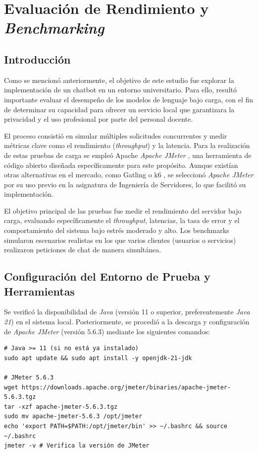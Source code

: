 \chapter{Evaluación de Rendimiento y \textit{Benchmarking}}

\section{Introducción}
Como se mencionó anteriormente, el objetivo de este estudio fue explorar la implementación de un chatbot en un entorno universitario. Para ello, resultó importante evaluar el desempeño de los modelos de lenguaje bajo carga, con el fin de determinar su capacidad para ofrecer un servicio local que garantizara la privacidad y el uso profesional por parte del personal docente.

El proceso consistió en simular múltiples solicitudes concurrentes y medir métricas clave como el rendimiento (\textit{throughput}) y la latencia. Para la realización de estas pruebas de carga se empleó Apache \textit{Apache JMeter} \cite{ref58}, una herramienta de código abierto diseñada específicamente para este propósito. Aunque existían otras alternativas en el mercado, como Gatling \cite{ref60} o k6 \cite{ref59}, se seleccionó \textit{Apache JMeter} por su uso previo en la asignatura de Ingeniería de Servidores, lo que facilitó su implementación.

El objetivo principal de las pruebas fue medir el rendimiento del servidor bajo carga, evaluando específicamente el \textit{throughput}, latencias, la tasa de error y el comportamiento del sistema bajo estrés moderado y alto. Los benchmarks simularon escenarios realistas en los que varios clientes (usuarios o servicios) realizaron peticiones de chat de manera simultánea.

\section{Configuración del Entorno de Prueba y Herramientas}
Se verificó la disponibilidad de \textit{Java} (versión 11 o superior, preferentemente \textit{Java 21}) en el sistema local. Posteriormente, se procedió a la descarga y configuración de \textit{Apache JMeter} (versión 5.6.3) mediante los siguientes comandos:
\newpage
\begin{verbatim}
# Java >= 11 (si no está ya instalado)
sudo apt update && sudo apt install -y openjdk-21-jdk

# JMeter 5.6.3
wget https://downloads.apache.org/jmeter/binaries/apache-jmeter-5.6.3.tgz
tar -xzf apache-jmeter-5.6.3.tgz
sudo mv apache-jmeter-5.6.3 /opt/jmeter
echo 'export PATH=$PATH:/opt/jmeter/bin' >> ~/.bashrc && source ~/.bashrc
jmeter -v # Verifica la versión de JMeter
\end{verbatim}

